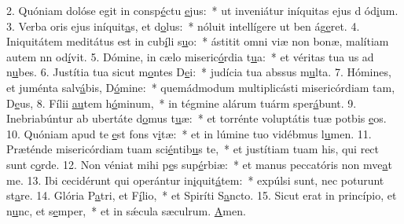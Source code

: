 2. Quóniam dolóse egit in consp\uline{é}ctu \uline{e}jus:~* ut inveniátur iníquitas ejus d ód\uline{i}um.
3. Verba oris ejus iníquit\uline{a}s, et d\uline{o}lus:~* nóluit intellígere ut ben ág\uline{e}ret.
4. Iniquitátem meditátus est in cub\uline{í}li s\uline{u}o:~* ástitit omni viæ non bonæ, malítiam autem nn od\uline{í}vit.
5. Dómine, in cælo miseric\uline{ó}rdia t\uline{u}a:~* et véritas tua us ad n\uline{u}bes.
6. Justítia tua sicut m\uline{o}ntes D\uline{e}i:~* judícia tua abssus m\uline{u}lta.
7. Hómines, et juménta salv\uline{á}bis, D\uline{ó}mine:~* quemádmodum multiplicásti misericórdiam tam, D\uline{e}us,
8. Fílii \uline{au}tem h\uline{ó}minum,~* in tégmine alárum tuárm sper\uline{á}bunt.
9. Inebriabúntur ab ubertáte d\uline{o}mus t\uline{u}æ:~* et torrénte voluptátis tuæ potbis \uline{e}os.
10. Quóniam apud te \uline{e}st fons v\uline{i}tæ:~* et in lúmine tuo vidébmus l\uline{u}men.
11. Præténde misericórdiam tuam sci\uline{é}ntib\uline{u}s te,~* et justítiam tuam his, qui rect sunt c\uline{o}rde.
12. Non véniat mihi p\uline{e}s sup\uline{é}rbiæ:~* et manus peccatóris non mve\uline{a}t me.
13. Ibi cecidérunt qui operántur in\uline{i}quit\uline{á}tem:~* expúlsi sunt, nec poturunt st\uline{a}re.
14. Glória P\uline{a}tri, et F\uline{í}lio,~* et Spiríti S\uline{a}ncto.
15. Sicut erat in princípio, et n\uline{u}nc, et s\uline{e}mper,~* et in sǽcula sæculrum. \uline{A}men.
